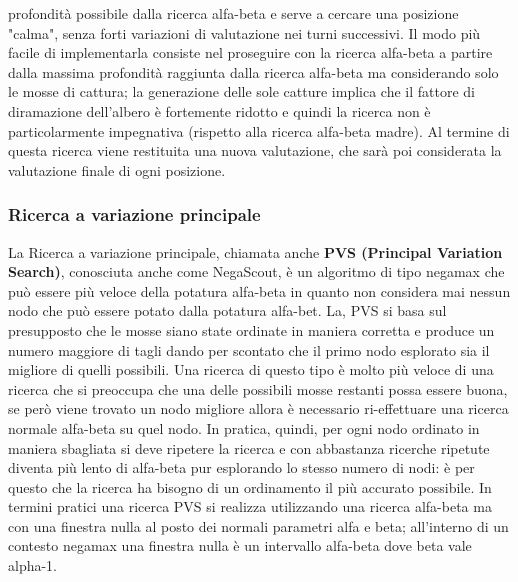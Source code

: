 profondità possibile dalla ricerca alfa-beta e serve a cercare una posizione "calma", senza forti variazioni di valutazione nei turni successivi. Il modo più facile di implementarla consiste nel proseguire con la ricerca
alfa-beta a partire dalla massima profondità raggiunta dalla ricerca alfa-beta ma considerando solo le mosse di cattura; la generazione delle sole catture implica che il fattore di diramazione dell'albero è fortemente ridotto e quindi la 
ricerca non è particolarmente impegnativa (rispetto alla ricerca alfa-beta madre). Al termine di questa ricerca viene restituita una nuova valutazione, che sarà poi considerata la valutazione finale di ogni posizione.


 


\subsubsection{Ricerca a variazione principale}
La Ricerca a variazione principale, chiamata anche \textbf{PVS (Principal Variation Search)}, conosciuta anche come NegaScout, è un algoritmo di tipo negamax che può essere più veloce della potatura alfa-beta 
in quanto non considera  mai nessun nodo che può essere potato dalla potatura alfa-bet. La, PVS si basa sul presupposto che le mosse siano state ordinate in maniera corretta e produce un numero maggiore di tagli
dando per scontato che il primo nodo esplorato sia il migliore di quelli possibili. Una ricerca di questo tipo è molto più veloce di una ricerca che si preoccupa che una delle possibili mosse restanti possa essere 
buona, se però viene trovato un nodo migliore allora è necessario ri-effettuare una ricerca normale alfa-beta su quel nodo. In pratica, quindi, per ogni nodo ordinato in maniera sbagliata si deve ripetere la ricerca e 
con abbastanza ricerche ripetute diventa più lento di alfa-beta pur esplorando lo stesso numero di nodi: è per questo che la ricerca ha bisogno di un ordinamento il più accurato possibile.
In termini pratici una ricerca PVS si realizza utilizzando una ricerca alfa-beta ma con una finestra nulla al posto dei normali parametri alfa e beta; all'interno di un contesto negamax una finestra nulla è un 
intervallo alfa-beta dove beta vale alpha-1.



